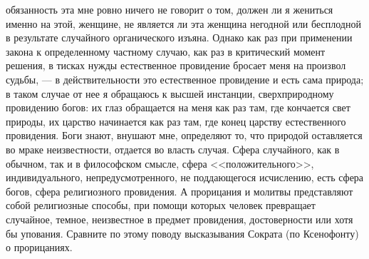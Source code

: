 \documentclass[12pt]{article}
\begin{document}
обязанность эта мне ровно ничего не говорит о том, должен ли я жениться именно на этой, женщине, не является ли эта женщина негодной или бесплодной в результате случайного органического изъяна. Однако как раз при применении закона к определенному частному случаю, как раз в критический момент решения, в тисках нужды естественное провидение бросает меня на произвол судьбы, --- в действительности это естественное провидение и есть сама природа; в таком случае от нее я обращаюсь к высшей инстанции, сверхприродному провидению богов: их глаз обращается на меня как раз там, где кончается свет природы, их царство начинается как раз там, где конец царству естественного провидения. Боги знают, внушают мне, определяют то, что природой оставляется во мраке неизвестности, отдается во власть случая. Сфера случайного, как в обычном, так и в философском смысле, сфера <<положительного>>, индивидуального, непредусмотренного, не поддающегося исчислению, есть сфера богов, сфера религиозного провидения. А прорицания и молитвы представляют собой религиозные способы, при помощи которых человек превращает случайное, темное, неизвестное в предмет провидения, достоверности или хотя бы упования. Сравните по этому поводу высказывания Сократа (по Ксенофонту) о прорицаниях.



\section{}
\end{document}
